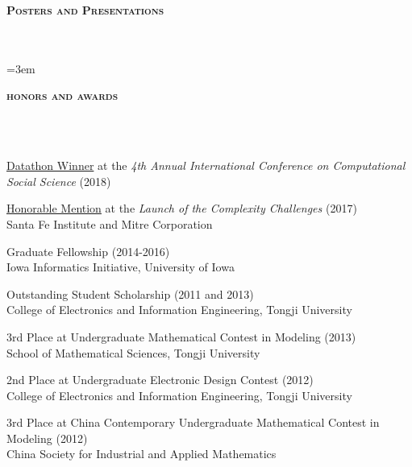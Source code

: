 \documentclass{article}
\newcommand{\header}[1]{{
\hspace*{-15pt}\vspace*{6pt} \textbf{\textsc{\large{#1}}}} \vspace*{-6pt} 
\lineunder
}
\newcommand{\lineunder}{
\vspace*{-8pt} \\ \hspace*{-15pt} 
\hrulefill \\
}
\renewcommand{\labelitemii}{
$\vcenter{\hbox{\tiny$\bullet$}}$\hspace*{-3pt}
}
\newenvironment{bullet-list-major}{
\begin{list}{\labelitemii}{\setlength\leftmargin{3pt} 
\topsep 0pt \itemsep -2pt}}{\vspace*{4pt}\end{list}
}
\begin{document}
\vspace*{4pt}%
\header{Posters and Presentations}

\nocite{*}
\newrefcontext[labelprefix=S]
\emergencystretch=3em
\printbibliography[keyword={S},heading=none] 

%



\vspace*{4pt}
\header{honors and awards}
\begin{bullet-list-major}
    \item \href{https://github.com/zhiyzuo/ic2s2_datathon/blob/master/datathon.pdf}{Datathon Winner} at the \textit{4th Annual International Conference on Computational Social Science} (2018)
    \item \href{https://bitbucket.org/zhiyzuo/complexity-challenge/src/master/}{Honorable Mention} at the \textit{Launch of the Complexity Challenges} (2017) \\
    Santa Fe Institute and Mitre Corporation
    \item Graduate Fellowship (2014-2016) \\
    Iowa Informatics Initiative, University of Iowa
    \item Outstanding Student Scholarship (2011 and 2013) \\
    College  of  Electronics  and  Information  Engineering, Tongji  University
    \item 3rd Place at Undergraduate Mathematical Contest in Modeling (2013) \\
    School of Mathematical Sciences, Tongji University
    \item 2nd Place at Undergraduate Electronic Design Contest (2012) \\
    College of Electronics and Information Engineering, Tongji University
    \item 3rd Place at China Contemporary Undergraduate Mathematical Contest in Modeling (2012) \\
    China Society for Industrial and Applied Mathematics
\end{bullet-list-major}
\end{document}
